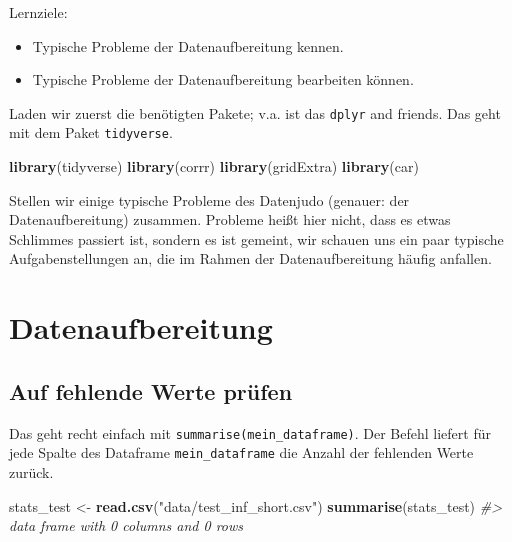 \documentclass[12pt,ngerman,]{book}
\makeatletter
\newenvironment{Shaded}{\begin{snugshade}}{\end{snugshade}}
\newcommand{\KeywordTok}[1]{\textcolor[rgb]{0.13,0.29,0.53}{\textbf{{#1}}}}
\newcommand{\StringTok}[1]{\textcolor[rgb]{0.31,0.60,0.02}{{#1}}}
\newcommand{\CommentTok}[1]{\textcolor[rgb]{0.56,0.35,0.01}{\textit{{#1}}}}
\newcommand{\NormalTok}[1]{{#1}}
\providecommand{\tightlist}{%
  \setlength{\itemsep}{0pt}\setlength{\parskip}{0pt}}
\newenvironment{kframe}{%
\medskip{}
\setlength{\fboxsep}{.8em}
 \def\at@end@of@kframe{}%
 \ifinner\ifhmode%
  \def\at@end@of@kframe{\end{minipage}}%
  \begin{minipage}{\columnwidth}%
 \fi\fi%
 \def\FrameCommand##1{\hskip\@totalleftmargin \hskip-\fboxsep
 \colorbox{shadecolor}{##1}\hskip-\fboxsep
     \hskip-\linewidth \hskip-\@totalleftmargin \hskip\columnwidth}%
 \MakeFramed {\advance\hsize-\width
   \@totalleftmargin\z@ \linewidth\hsize
   \@setminipage}}%
 {\par\unskip\endMakeFramed%
 \at@end@of@kframe}
\renewenvironment{Shaded}{\begin{kframe}}{\end{kframe}}
\let\BeginKnitrBlock\begin \let\EndKnitrBlock\end
\makeatother
\begin{document}
\BeginKnitrBlock{rmdcaution}
Lernziele:

\begin{itemize}
\tightlist
\item
  Typische Probleme der Datenaufbereitung kennen.
\item
  Typische Probleme der Datenaufbereitung bearbeiten können.
\end{itemize}
\EndKnitrBlock{rmdcaution}

Laden wir zuerst die benötigten Pakete; v.a. ist das \texttt{dplyr} and
friends. Das geht mit dem Paket \texttt{tidyverse}.

\begin{Shaded}
\begin{Highlighting}[]
\KeywordTok{library}\NormalTok{(tidyverse)}
\KeywordTok{library}\NormalTok{(corrr)}
\KeywordTok{library}\NormalTok{(gridExtra)}
\KeywordTok{library}\NormalTok{(car)}
\end{Highlighting}
\end{Shaded}

Stellen wir einige typische Probleme des Datenjudo (genauer: der
Datenaufbereitung) zusammen. Probleme heißt hier nicht, dass es etwas
Schlimmes passiert ist, sondern es ist gemeint, wir schauen uns ein paar
typische Aufgabenstellungen an, die im Rahmen der Datenaufbereitung
häufig anfallen.

\section{Datenaufbereitung}\label{datenaufbereitung}

\subsection{Auf fehlende Werte prüfen}\label{auf-fehlende-werte-prufen}

Das geht recht einfach mit \texttt{summarise(mein\_dataframe)}. Der
Befehl liefert für jede Spalte des Dataframe \texttt{mein\_dataframe}
die Anzahl der fehlenden Werte zurück.

\begin{Shaded}
\begin{Highlighting}[]
\NormalTok{stats_test <-}\StringTok{ }\KeywordTok{read.csv}\NormalTok{(}\StringTok{"data/test_inf_short.csv"}\NormalTok{)}
\KeywordTok{summarise}\NormalTok{(stats_test)}
\CommentTok{#> data frame with 0 columns and 0 rows}
\end{Highlighting}
\end{Shaded}
\end{document}
